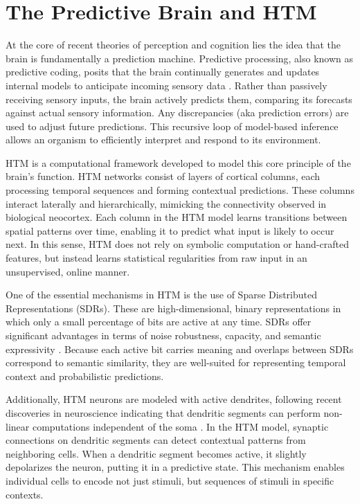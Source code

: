 \documentclass{article}
\begin{document}
\section{The Predictive Brain and HTM}

At the core of recent theories of perception and cognition lies the idea that the brain is fundamentally a prediction machine. Predictive processing, also known as predictive coding, posits that the brain continually generates and updates internal models to anticipate incoming sensory data \parencite{clark2016surfing, friston2010free}. Rather than passively receiving sensory inputs, the brain actively predicts them, comparing its forecasts against actual sensory information. Any discrepancies (aka prediction errors) are used to adjust future predictions. This recursive loop of model-based inference allows an organism to efficiently interpret and respond to its environment.

HTM is a computational framework developed to model this core principle of the brain's function. HTM networks consist of layers of cortical columns, each processing temporal sequences and forming contextual predictions. These columns interact laterally and hierarchically, mimicking the connectivity observed in biological neocortex. Each column in the HTM model learns transitions between spatial patterns over time, enabling it to predict what input is likely to occur next. In this sense, HTM does not rely on symbolic computation or hand-crafted features, but instead learns statistical regularities from raw input in an unsupervised, online manner.

One of the essential mechanisms in HTM is the use of Sparse Distributed Representations (SDRs). These are high-dimensional, binary representations in which only a small percentage of bits are active at any time. SDRs offer significant advantages in terms of noise robustness, capacity, and semantic expressivity \parencite{ahmad2015properties}. Because each active bit carries meaning and overlaps between SDRs correspond to semantic similarity, they are well-suited for representing temporal context and probabilistic predictions.

Additionally, HTM neurons are modeled with active dendrites, following recent discoveries in neuroscience indicating that dendritic segments can perform non-linear computations independent of the soma \parencite{mountcastle1998perceptual,hawkins2016why,hawkins2004intelligence}. In the HTM model, synaptic connections on dendritic segments can detect contextual patterns from neighboring cells. When a dendritic segment becomes active, it slightly depolarizes the neuron, putting it in a predictive state. This mechanism enables individual cells to encode not just stimuli, but sequences of stimuli in specific contexts.
\end{document}
